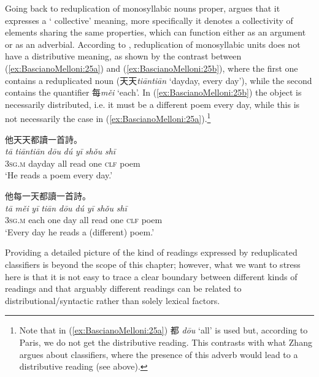 \documentclass[output=paper]{langsci/langscibook}
\begin{document}
Going back to reduplication of monosyllabic nouns proper, 
\citet{Paris2007}
argues that it expresses a ` collective' meaning, more
specifically it denotes a collectivity of elements sharing the same
properties, which can function either as an argument or as an adverbial.
According to %
\citet[69-70]{Paris2007}%
%
, reduplication of monosyllabic units
does not have a distributive meaning, as shown by the contrast between
(\ref{ex:BascianoMelloni:25a}) and (\ref{ex:BascianoMelloni:25b}), where the first one contains a reduplicated noun
(天天\emph{tiān\tld{}tiān} `day\emph{\tld{}}day,
every day'), while the second contains the quantifier 每\emph{měi}
`each'. In (\ref{ex:BascianoMelloni:25b}) the object is necessarily distributed, i.e. it must be
a different poem every day, while this is not necessarily the case in
(\ref{ex:BascianoMelloni:25a}).\footnote{Note that in (\ref{ex:BascianoMelloni:25a}) 都
  \emph{dōu} `all' is used but, according to Paris, we do not get the
  distributive reading. This contrasts with what Zhang argues about
  classifiers, where the presence of this adverb would lead to a
  distributive reading (see above).}
  
  
\ea\label{ex:BascianoMelloni:25}
\ea\label{ex:BascianoMelloni:25a} 他天天都讀一首詩。\\
\gll \emph{tā} \emph{tiān\tld{}tiān} \emph{dōu} \emph{dú} \emph{yī} \emph{shǒu} \emph{shī}\\
 3\textsc{sg.m} day\tld{}day all read one \textsc{clf} poem\\
\glt `He reads a poem every day.'

\ex\label{ex:BascianoMelloni:25b} 他每一天都讀一首詩。\\
\gll \emph{tā} \emph{měi} \emph{yī} \emph{tiān} \emph{dōu} \emph{dú} \emph{yī} \emph{shǒu} \emph{shī}\\
 3\textsc{sg.m} each one day all read one \textsc{clf} poem\\
 \glt `Every day he reads a (different) poem.'\\

 \z\z

Providing a detailed picture of the kind of  readings expressed by
reduplicated classifiers is beyond the scope of this chapter; however,
what we want to stress here is that it is not easy to trace a clear
boundary between different kinds of  readings and that arguably
different readings can be related to distributional/syntactic rather
than solely lexical factors.
\end{document}
